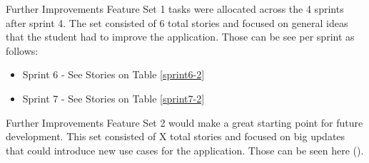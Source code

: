 Further Improvements Feature Set 1 tasks were allocated across the 4 sprints after sprint 4. The set consisted of 6 total stories and focused on general ideas that the student had to improve the application. Those can be see per sprint as follows:

\begin{itemize}
    \item Sprint 6 - See Stories on Table \ref{sprint6-2}
    \item Sprint 7 - See Stories on Table \ref{sprint7-2}
\end{itemize}

Further Improvements Feature Set 2 would make a great starting point for future development. This set consisted of X total stories and focused on big updates that could introduce new use cases for the application. Those can be seen here ().